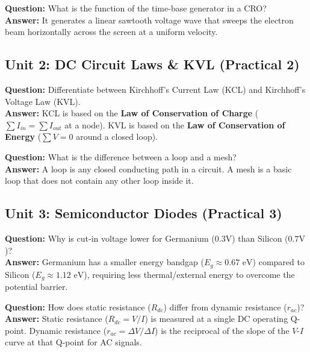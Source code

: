 \begin{vivaqa}
\textbf{Question:} What is the function of the time-base generator in a CRO?\\[4pt]
\textbf{Answer:} It generates a linear sawtooth voltage wave that sweeps the electron beam horizontally across the screen at a uniform velocity.
\end{vivaqa}

\subsection{Unit 2: DC Circuit Laws \& KVL (Practical 2)}

\begin{vivaqa}
\textbf{Question:} Differentiate between Kirchhoff's Current Law (KCL) and Kirchhoff's Voltage Law (KVL).\\[4pt]
\textbf{Answer:} KCL is based on the \textbf{Law of Conservation of Charge} ($\sum I_{in} = \sum I_{out}$ at a node). KVL is based on the \textbf{Law of Conservation of Energy} ($\sum V = 0$ around a closed loop).
\end{vivaqa}

\begin{vivaqa}
\textbf{Question:} What is the difference between a loop and a mesh?\\[4pt]
\textbf{Answer:} A loop is any closed conducting path in a circuit. A mesh is a basic loop that does not contain any other loop inside it.
\end{vivaqa}

\subsection{Unit 3: Semiconductor Diodes (Practical 3)}

\begin{vivaqa}
\textbf{Question:} Why is cut-in voltage lower for Germanium ($0.3\text{V}$) than Silicon ($0.7\text{V}$)?\\[4pt]
\textbf{Answer:} Germanium has a smaller energy bandgap ($E_g \approx 0.67\text{ eV}$) compared to Silicon ($E_g \approx 1.12\text{ eV}$), requiring less thermal/external energy to overcome the potential barrier.
\end{vivaqa}

\begin{vivaqa}
\textbf{Question:} How does static resistance ($R_{dc}$) differ from dynamic resistance ($r_{ac}$)?\\[4pt]
\textbf{Answer:} Static resistance ($R_{dc} = V/I$) is measured at a single DC operating Q-point. Dynamic resistance ($r_{ac} = \Delta V / \Delta I$) is the reciprocal of the slope of the $V$-$I$ curve at that Q-point for AC signals.
\end{vivaqa}

